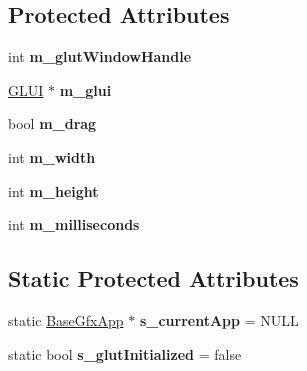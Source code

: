 \subsection*{Protected Attributes}
\begin{DoxyCompactItemize}
\item 
\hypertarget{classBaseGfxApp_ad8697d6fdd10e6f336c3a662016b4fa7}{int {\bfseries m\-\_\-glut\-Window\-Handle}}\label{classBaseGfxApp_ad8697d6fdd10e6f336c3a662016b4fa7}

\item 
\hypertarget{classBaseGfxApp_a1435ba2e22c8f5897964b24e988da18d}{\hyperlink{classGLUI}{G\-L\-U\-I} $\ast$ {\bfseries m\-\_\-glui}}\label{classBaseGfxApp_a1435ba2e22c8f5897964b24e988da18d}

\item 
\hypertarget{classBaseGfxApp_a2e70a389224f8affe7c137f7e20dc8c1}{bool {\bfseries m\-\_\-drag}}\label{classBaseGfxApp_a2e70a389224f8affe7c137f7e20dc8c1}

\item 
\hypertarget{classBaseGfxApp_a7e5ef1c8f25fe081b4a1fd4ce6a96e07}{int {\bfseries m\-\_\-width}}\label{classBaseGfxApp_a7e5ef1c8f25fe081b4a1fd4ce6a96e07}

\item 
\hypertarget{classBaseGfxApp_ac078e4fc20b5c2fe0c744966b850b412}{int {\bfseries m\-\_\-height}}\label{classBaseGfxApp_ac078e4fc20b5c2fe0c744966b850b412}

\item 
\hypertarget{classBaseGfxApp_a72e7753eb311a758240ef4998e7130c8}{int {\bfseries m\-\_\-milliseconds}}\label{classBaseGfxApp_a72e7753eb311a758240ef4998e7130c8}

\end{DoxyCompactItemize}
\subsection*{Static Protected Attributes}
\begin{DoxyCompactItemize}
\item 
\hypertarget{classBaseGfxApp_a9ef4c8189639df51e80ee8032d80237d}{static \hyperlink{classBaseGfxApp}{Base\-Gfx\-App} $\ast$ {\bfseries s\-\_\-current\-App} = N\-U\-L\-L}\label{classBaseGfxApp_a9ef4c8189639df51e80ee8032d80237d}

\item 
\hypertarget{classBaseGfxApp_a8f766269d3909328d3c630f0fc579665}{static bool {\bfseries s\-\_\-glut\-Initialized} = false}\label{classBaseGfxApp_a8f766269d3909328d3c630f0fc579665}

\end{DoxyCompactItemize}


